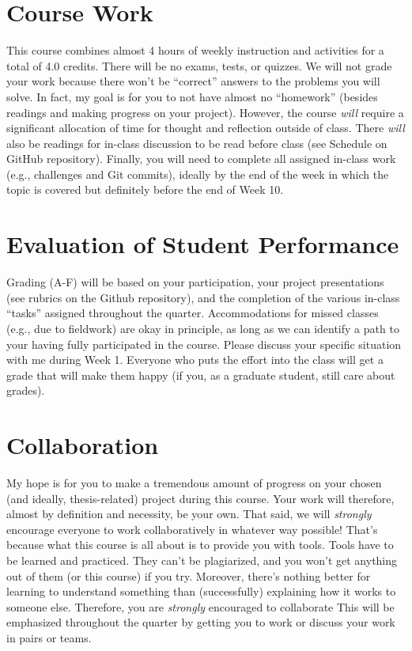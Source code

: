 \documentclass[10pt]{article}
\begin{document}
\section*{Course Work}
This course combines almost 4 hours of weekly instruction and activities for a total of 4.0 credits.
There will be no exams, tests, or quizzes.
We will not grade your work because there won't be ``correct'' answers to the problems you will
solve.
In fact, my goal is for you to not have almost no ``homework'' (besides readings and making progress
on your project).
However, the course \textit{will} require a significant allocation of time for thought and reflection outside
of class.
There \textit{will} also be readings for in-class discussion to be read before class (see Schedule on GitHub repository).
Finally, you will need to complete all assigned in-class work (e.g., challenges and Git commits), ideally
by the end of the week in which the topic is covered but definitely before the end of Week 10.

\section*{Evaluation of Student Performance}
Grading (A-F) will be based on your participation, your project presentations (see rubrics on the Github repository),
and the completion of the various in-class ``tasks'' assigned throughout the quarter.
Accommodations for missed classes (e.g., due to fieldwork) are okay in principle, as long as we can identify a path to your having fully participated in the course.
Please discuss your specific situation with me during Week 1.
Everyone who puts the effort into the class will get a grade that will make them happy (if you, as a graduate student, still care about grades).

\section*{Collaboration}
My hope is for you to make a tremendous amount of progress on your chosen (and ideally, thesis-related) project during this course.
Your work will therefore, almost by definition and necessity, be your own.
That said, we will \textit{strongly} encourage everyone to work collaboratively in whatever way possible!
That's because what this course is all about is to provide you with tools.
Tools have to be learned and practiced.
They can't be plagiarized, and you won't get anything out of them (or this course) if you try.
Moreover, there's nothing better for learning to understand something than (successfully) explaining how it works to someone else.
Therefore, you are \textit{strongly} encouraged to collaborate
This will be emphasized throughout the quarter by getting you to work or discuss your work in pairs or teams.
\end{document}
